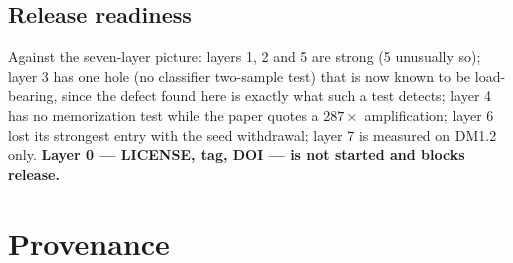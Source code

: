 \documentclass[11pt,a4paper]{article}
\begin{document}
\subsection*{Release readiness}

Against the seven-layer picture: layers 1, 2 and 5 are strong (5 unusually so);
layer 3 has one hole (no classifier two-sample test) that is now known to be
load-bearing, since the defect found here is exactly what such a test detects;
layer 4 has no memorization test while the paper quotes a $287\times$
amplification; layer 6 lost its strongest entry with the seed withdrawal;
layer 7 is measured on DM1.2 only. \textbf{Layer 0 --- LICENSE, tag, DOI --- is
not started and blocks release.}

\section{Provenance}
\end{document}
